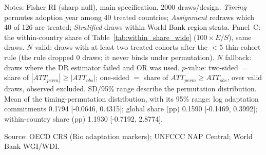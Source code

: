 \begin{table}[H]
\begin{minipage}{\linewidth}
Notes: Fisher RI (sharp null), main specification, 2000 draws/design. \textit{Timing} permutes adoption year among 40 treated countries; \textit{Assignment} redraws which 40 of 126 are treated; \textit{Stratified} draws within World Bank region strata. Panel~C: the within-country share of Table~\ref{tab:within_share_wide} ($100 \times E/S$), same draws. $N$ valid: draws with at least two treated cohorts after the $<$5 thin-cohort rule (the rule dropped 0 draws; it never binds under permutation). $N$ fallback: draws where the DR estimator failed and OR was used. $p$-value: two-sided $=$ share of $|ATT_{perm}| \geq |ATT_{obs}|$; one-sided $=$ share of $ATT_{perm} \geq ATT_{obs}$, over valid draws, observed excluded. SD/95\% range describe the permutation distribution. Mean of the timing-permutation distribution, with its 95\% range: log adaptation commitments 0.1794 [-0.0646, 0.4315]; global share (pp) 0.1590 [-0.1469, 0.3992]; within-country share (pp) 1.1930 [-0.7192, 2.8774].\par
Source: OECD CRS (Rio adaptation markers); UNFCCC NAP Central; World Bank WGI/WDI.
\end{minipage}
\end{table}
